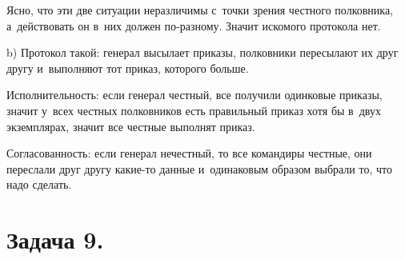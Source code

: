 \documentclass{article}
\begin{document}
Ясно, что эти две ситуации неразличимы с~точки зрения честного полковника,
а~действовать он в~них должен по-разному. Значит искомого протокола нет.

b) Протокол такой: генерал высылает приказы, полковники пересылают их друг другу
и~выполняют тот приказ, которого больше.

Исполнительность: если генерал честный, все получили одинковые приказы, значит
у~всех честных полковников есть правильный приказ хотя бы в~двух экземплярах,
значит все честные выполнят приказ.

Согласованность: если генерал нечестный, то все командиры честные, они переслали
друг другу какие-то данные и~одинаковым образом выбрали то, что надо сделать.

\section*{Задача 9.}
\end{document}

